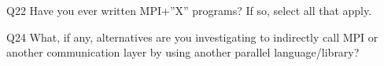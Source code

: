 \begin{description}%
\item{Q22} Have you ever written MPI+”X” programs? If so, select all that apply.%
\item{Q24} What, if any, alternatives are you investigating to indirectly call MPI or another communication layer by using another parallel language/library?%
\end{description}%
